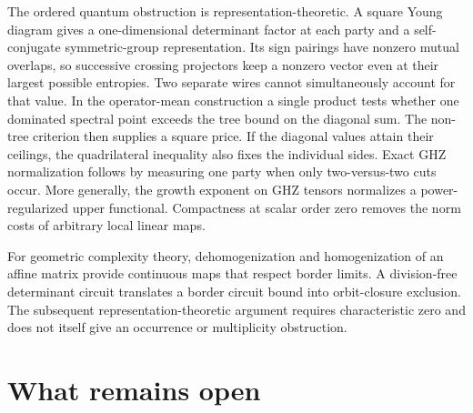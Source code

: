 \documentclass[11pt,a4paper]{article}
\theoremstyle{definition}
\theoremstyle{remark}
\begin{document}
The ordered quantum obstruction is representation-theoretic.
A square Young diagram gives a one-dimensional determinant factor at
each party and a self-conjugate symmetric-group representation.
Its sign pairings have nonzero mutual overlaps, so successive crossing
projectors keep a nonzero vector even at their largest possible
entropies. Two separate wires cannot simultaneously account for that
value. In the operator-mean construction a single product tests
whether one dominated spectral point exceeds the tree bound
on the diagonal sum. The non-tree criterion then supplies a
square price. If the diagonal values attain their ceilings,
the quadrilateral inequality also fixes the individual sides.
Exact GHZ normalization follows by measuring one party when only
two-versus-two cuts occur. More generally, the growth exponent on GHZ
tensors normalizes a power-regularized upper functional.
Compactness at scalar order zero removes the norm costs of arbitrary
local linear maps.

For geometric complexity theory, dehomogenization and homogenization
of an affine matrix provide continuous maps that respect border
limits. A division-free determinant circuit translates a border
circuit bound into orbit-closure exclusion. The subsequent
representation-theoretic argument requires characteristic zero and
does not itself give an occurrence or multiplicity obstruction.

























\section{What remains open}\label{sec:open}
\end{document}

